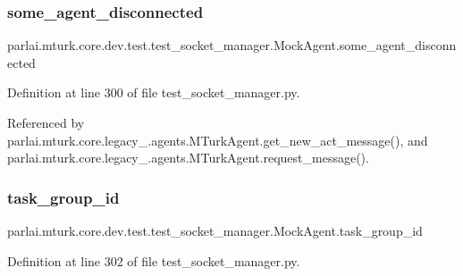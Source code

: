 \subsubsection{\texorpdfstring{some\+\_\+agent\+\_\+disconnected}{some\_agent\_disconnected}}
{\footnotesize\ttfamily parlai.\+mturk.\+core.\+dev.\+test.\+test\+\_\+socket\+\_\+manager.\+Mock\+Agent.\+some\+\_\+agent\+\_\+disconnected}



Definition at line 300 of file test\+\_\+socket\+\_\+manager.\+py.



Referenced by parlai.\+mturk.\+core.\+legacy\+\_.\+agents.\+M\+Turk\+Agent.\+get\+\_\+new\+\_\+act\+\_\+message(), and parlai.\+mturk.\+core.\+legacy\+\_.\+agents.\+M\+Turk\+Agent.\+request\+\_\+message().

\mbox{\label{classparlai_1_1mturk_1_1core_1_1dev_1_1test_1_1test__socket__manager_1_1MockAgent_abbdca65743dccef13d2168f4904f1bf8}} 
\subsubsection{\texorpdfstring{task\+\_\+group\+\_\+id}{task\_group\_id}}
{\footnotesize\ttfamily parlai.\+mturk.\+core.\+dev.\+test.\+test\+\_\+socket\+\_\+manager.\+Mock\+Agent.\+task\+\_\+group\+\_\+id}



Definition at line 302 of file test\+\_\+socket\+\_\+manager.\+py.



